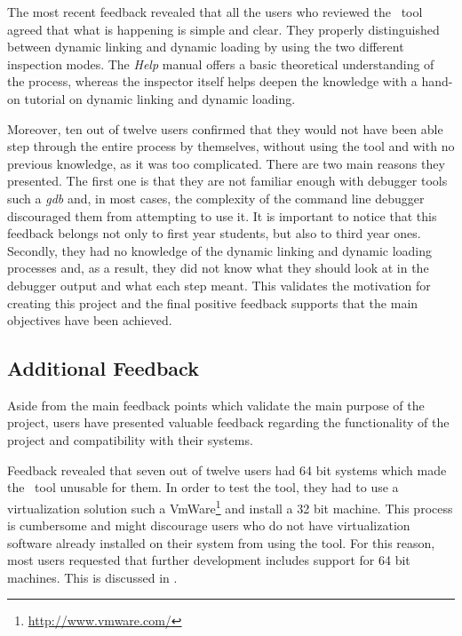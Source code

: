 The most recent feedback revealed that all the users who reviewed the \project\ tool agreed that what is happening is simple and clear. They properly distinguished between dynamic linking and dynamic loading by using the two different inspection modes. The \textit{Help} manual offers a basic theoretical understanding of the process, whereas the inspector itself helps deepen the knowledge with a hand-on tutorial on dynamic linking and dynamic loading.

Moreover, ten out of twelve users confirmed that they would not have been able step through the entire process by themselves, without using the tool and with no previous knowledge, as it was too complicated. There are two main reasons they presented. The first one is that they are not familiar enough with debugger tools such a \textit{gdb} and, in most cases, the complexity of the command line debugger discouraged them from attempting to use it. It is important to notice that this feedback belongs not only to first year students, but also to third year ones. Secondly, they had no knowledge of the dynamic linking and dynamic loading processes and, as a result, they did not know what they should look at in the debugger output and what each step meant. This validates the motivation for creating this project and the final positive feedback supports that the main objectives have been achieved.
 
\subsection{Additional Feedback}
\label{sub-sec:additional-feedback}

Aside from the main feedback points which validate the main purpose of the project, users have presented valuable feedback regarding the functionality of the project and compatibility with their systems.

Feedback revealed that seven out of twelve users had 64 bit systems which made the \project\ tool unusable for them. In order to test the tool, they had to use a virtualization solution such a VmWare\footnote{\url{http://www.vmware.com/}} and install a 32 bit machine. This process is cumbersome and might discourage users who do not have virtualization software already installed on their system from using the tool. For this reason, most users requested that further development includes support for 64 bit machines. This is discussed in .

